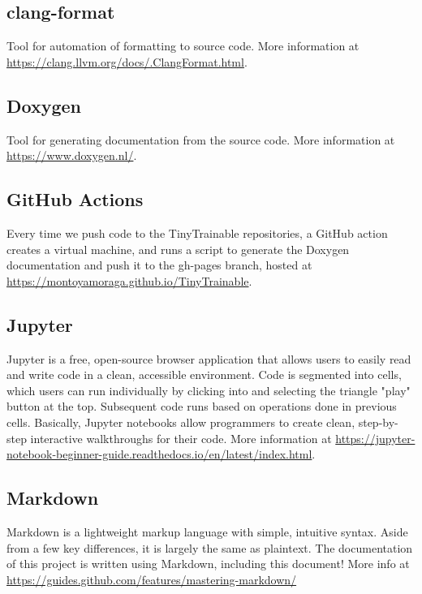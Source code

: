 \subsection{clang-format}

Tool for automation of formatting to source code. More information at \url{https://clang.llvm.org/docs/.ClangFormat.html}.

\subsection{Doxygen}

Tool for generating documentation from the source code. More information at \url{https://www.doxygen.nl/}.

\subsection{GitHub Actions}

Every time we push code to the TinyTrainable repositories, a GitHub action creates a virtual machine, and runs a script to generate the Doxygen documentation and push it to the gh-pages branch, hosted at \url{https://montoyamoraga.github.io/TinyTrainable}.

\subsection{Jupyter}

Jupyter is a free, open-source browser application that allows users to easily read and write code in a clean, accessible environment. Code is segmented into cells, which users can run individually by clicking into and selecting the triangle "play" button at the top. Subsequent code runs based on operations done in previous cells. Basically, Jupyter notebooks allow programmers to create clean, step-by-step interactive walkthroughs for their code. More information at \url{https://jupyter-notebook-beginner-guide.readthedocs.io/en/latest/index.html}.

\subsection{Markdown}

Markdown is a lightweight markup language with simple, intuitive syntax. Aside from a few key differences, it is largely the same as plaintext. The documentation of this project is written using Markdown, including this document! More info at \url{https://guides.github.com/features/mastering-markdown/}
